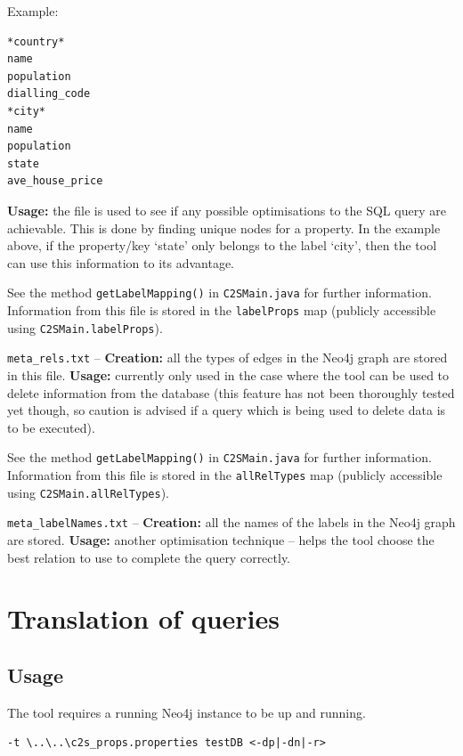 \documentclass[letterpaper]{ltxdoc}
\begin{document}
Example:
\begin{verbatim}
*country*
name
population
dialling_code
*city*
name
population
state
ave_house_price
\end{verbatim}

\textbf{Usage:} the file is used to see if any possible optimisations to the SQL query are achievable. This is done by finding unique nodes for a property. In the example above, if the property/key `state' only belongs to the label `city', then the tool can use this information to its advantage.

See the method \texttt{getLabelMapping()} in \texttt{C2SMain.java} for further information. Information from this file is stored in the \texttt{labelProps} map (publicly accessible using \texttt{C2SMain.labelProps}).

\bigskip

\texttt{meta\_rels.txt} -- \textbf{Creation:} all the types of edges in the Neo4j graph are stored in this file.
\textbf{Usage:} currently only used in the case where the tool can be used to delete information from the database (this feature has not been thoroughly tested yet though, so caution is advised if a query which is being used to delete data is to be executed).

See the method \texttt{getLabelMapping()} in \texttt{C2SMain.java} for further information. Information from this file is stored in the \texttt{allRelTypes} map (publicly accessible using \texttt{C2SMain.allRelTypes}).

\bigskip

\texttt{meta\_labelNames.txt} -- \textbf{Creation:} all the names of the labels in the Neo4j graph are stored.
\textbf{Usage:} another optimisation technique -- helps the tool choose the best relation to use to complete the query correctly.


\section{Translation of queries}
\label{sec:tranQ}
\subsection{Usage}
The tool requires a running Neo4j instance to be up and running.

\medskip

\begin{verbatim}
-t \..\..\c2s_props.properties testDB <-dp|-dn|-r>
\end{verbatim}
\end{document}
